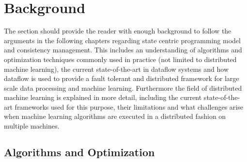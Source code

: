 
\chapter{Background}
\label{c:background}
The section should provide the reader with enough background to follow the arguments in the following chapters regarding state centric programming model and consistency management.
This includes an understanding of algorithms and optimization techniques commonly used in practice (not limited to distributed machine learning), the current state-of-the-art in dataflow systems and how dataflow is used to provide a fault tolerant and distributed framework for large scale data processing and machine learning.
Furthermore the field of distributed machine learning is explained in more detail, including the current state-of-the-art frameworks used for this purpose, their limitations and what challenges arise when machine learning algorithms are executed in a distributed fashion on multiple machines.


\section{Algorithms and Optimization}

